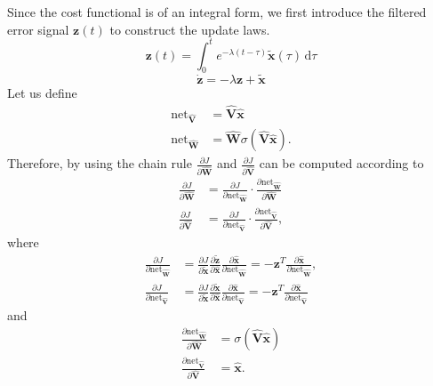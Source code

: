 \documentclass[10pt,twocolumn]{ICCAS}
\newcommand{\ud}{\,\mathrm{d}}
\newcommand{\xtilde}{\tilde{\bm{x}}}
\begin{document}
Since the cost functional is of an integral form, we first introduce the filtered error signal $\bm{z}(t)$ to construct the update laws.
\begin{equation}
    \bm{z}(t) = \int_{0}^{t} e^{-\lambda(t-\tau)} \xtilde(\tau) \ud\tau
    \label{eq:filter_z}
\end{equation}
\begin{equation}
    \dot{\bm{z}} = - \lambda\bm{z} + \xtilde
    \label{eq:filter_z_dot}
\end{equation}
Let us define
\begin{align*}
    \text{net}_{\hat{\mathbf{V}}} &= \hat{\mathbf{V}}\hat{\bm{x}}  \\
    \text{net}_{\hat{\mathbf{W}}} &= \hat{\mathbf{W}}\sigma(\hat{\mathbf{V}}\hat{\bm{x}}).
\end{align*}
Therefore, by using the chain rule $\frac{\partial J}{\partial \hat{\mathbf{W}}}$ and $\frac{\partial J}{\partial \hat{\mathbf{V}}}$ can be computed according to
\begin{align*}
    \frac{\partial J}{\partial \hat{\mathbf{W}}} &= \frac{\partial J}{\partial \text{net}_{\hat{\mathbf{W}}}} \cdot \frac{\partial \text{net}_{\hat{\mathbf{W}}}}{\partial \hat{\mathbf{W}}} \\
    \frac{\partial J}{\partial \hat{\mathbf{V}}} &= \frac{\partial J}{\partial \text{net}_{\hat{\mathbf{V}}}} \cdot \frac{\partial \text{net}_{\hat{\mathbf{V}}}}{\partial \hat{\mathbf{V}}},
\end{align*}
where
\begin{align*}
    \frac{\partial J}{\partial \text{net}_{\hat{\mathbf{W}}}} 
    &= \frac{\partial J}{\partial \tilde{\bm{x}}} \frac{\partial \tilde{\bm{z}}}{\partial \hat{\bm{x}}} \frac{\partial \hat{\bm{x}}}{\partial \text{net}_{\hat{\mathbf{W}}}} = -{\bm{z}}^T \frac{\partial \hat{\bm{x}}}{\partial \text{net}_{\hat{\mathbf{W}}}}, \nonumber \\
    \frac{\partial J}{\partial \text{net}_{\hat{\mathbf{V}}}} 
    &= \frac{\partial J}{\partial \tilde{\bm{x}}} \frac{\partial \tilde{\bm{x}}}{\partial \hat{\bm{x}}} \frac{\partial \hat{\bm{x}}}{\partial \text{net}_{\hat{\mathbf{V}}}} = -{\bm{z}}^T \frac{\partial \hat{\bm{x}}}{\partial \text{net}_{\hat{\mathbf{V}}}}
\end{align*}
and
\begin{align*}
    \frac{\partial \text{net}_{\hat{\mathbf{W}}}}{\partial \hat{\mathbf{W}}} &= \sigma(\hat{\mathbf{V}}\hat{\bm{x}}) \nonumber \\
    \frac{\partial \text{net}_{\hat{\mathbf{V}}}}{\partial \hat{\mathbf{V}}} &= \hat{\bm{x}}.
\end{align*}
\end{document}
